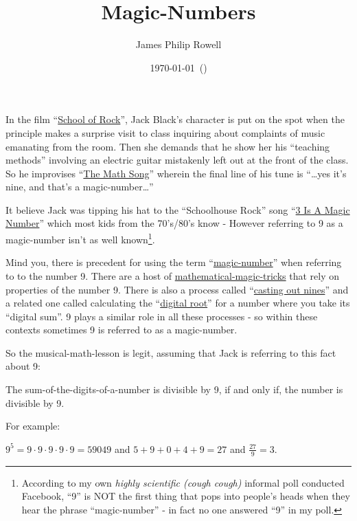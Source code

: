 \documentclass{article}
\title{\vspace{-1.5cm}Magic-Numbers}
\author{James Philip Rowell}
\date{\vspace{-0.5cm}\footnotesize\today\ (\jprVersion)} %
\newenvironment{jprIn}{\begin{adjustwidth}{2em}{}}{\end{adjustwidth}}
\begin{document}
\maketitle

In the film ``\href{https://en.wikipedia.org/wiki/School_of_Rock}{School
of Rock}'', Jack Black's character is put on the spot when
the principle makes a surprise visit to class
inquiring about complaints of music emanating from the room. Then she demands that he show
her his ``teaching methods'' involving an electric guitar mistakenly
left out at the front of the class.
So he improvises ``\href{https://www.youtube.com/watch?v=aa8U0nL-KXg}{The
Math Song}'' wherein the final line of his
tune is ``\dots{}yes it's nine, and that's a magic-number\dots{}''

It believe Jack was tipping his hat
to the ``Schoolhouse Rock'' song ``\href{https://youtu.be/aU4pyiB-kq0}{3
Is A Magic Number}''
which most kids from the 70's/80's know -
However referring to 9 as a magic-number isn't
as well known\footnote{According to my own \emph{highly scientific (cough cough)}
informal poll conducted Facebook, %
``9'' is NOT the first thing that pops into people's heads when they
hear the phrase ``magic-number'' - in fact no one answered ``9'' in my poll.}.

Mind you, there is precedent
for using the term ``\href{http://mathworld.wolfram.com/MagicNumber.html}{magic-number}''
when referring to to the number 9.
There are a host of
\href{http://mathematics-in-europe.eu/?p=144}{mathematical-magic-tricks}
that rely on properties of the number 9.
There is also a process called
``\href{https://en.wikipedia.org/wiki/Casting_out_nines}{casting out nines}'' and a related one 
called calculating the
``\href{http://mathworld.wolfram.com/DigitalRoot.html}{digital root}''
for a number where you take its ``digital sum''. 9 plays a similar role
in all these processes - so within these contexts sometimes 9
is referred to as a magic-number.

So the musical-math-lesson is legit, assuming that Jack is referring to this fact about 9:
\begin{center}
The sum-of-the-digits-of-a-number is divisible by 9,
\break
if and only if,
\break
the number
is divisible by 9.
\end{center}

For example:
\begin{jprIn}
$9^5=9\cdot{}9\cdot{}9\cdot{}9\cdot{}9=59049$
\quad and \quad $5+9+0+4+9=27$ \quad and \quad $\frac{27}{9} = 3$.
\end{jprIn}
\end{document}
